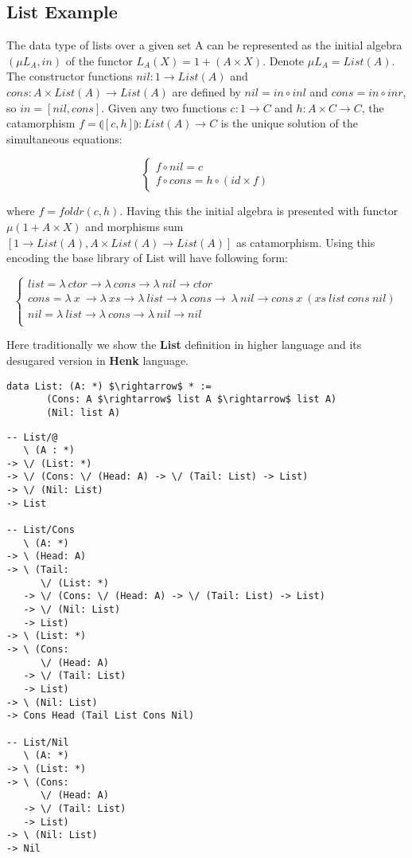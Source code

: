 \documentclass{article}
\begin{document}
\subsection{List Example}
The data type of lists over a given set A can be represented as the initial algebra
$(\mu L_A, in)$ of the functor $L_A(X) = 1 + (A \times X)$. Denote $\mu L_A = List(A)$.
The constructor functions $nil: 1 \rightarrow List(A)$ and
$cons: A \times List(A) \rightarrow List(A)$ are defined by
$nil = in \circ inl$ and $cons = in \circ inr$, so $in = [nil,cons]$.
Given any two functions $c: 1 \rightarrow C$ and $h: A \times C \rightarrow C$,
the catamorphism $f = \llparenthesis [c,h] \rrparenthesis : List(A) \rightarrow C$
is the unique solution of the simultaneous equations:

$$
\begin{cases}
  f \circ nil  = c \\
  f \circ cons = h \circ (id \times f)
\end{cases}
$$

where $f = foldr(c,h)$. Having this the initial algebra is presented with functor
$\mu (1 + A \times X)$ and morphisms sum $[1 \rightarrow List(A), A \times List(A) \rightarrow List(A)]$
as catamorphism. Using this encoding the base library of List will have following form:

$$
\begin{cases}
list = \lambda\ ctor \rightarrow \lambda\ cons \rightarrow \lambda\ nil \rightarrow ctor\\
cons = \lambda\ x\ \rightarrow \lambda\ xs \rightarrow \lambda\ list \rightarrow \lambda\ cons \rightarrow\ \lambda\ nil \rightarrow cons\ x\ (xs\ list\ cons\ nil)\\
nil = \lambda\ list \rightarrow \lambda\ cons \rightarrow \lambda\ nil \rightarrow nil\\
\end{cases}
$$

Here traditionally we show the {\bf List} definition in higher language and its
desugared version in {\bf Henk} language.

\begin{lstlisting}[mathescape=true]
  data List: (A: *) $\rightarrow$ * :=
       (Cons: A $\rightarrow$ list A $\rightarrow$ list A)
       (Nil: list A)
\end{lstlisting}

\begin{lstlisting}[mathescape=true]
-- List/@
   \ (A : *)
-> \/ (List: *)
-> \/ (Cons: \/ (Head: A) -> \/ (Tail: List) -> List)
-> \/ (Nil: List)
-> List

-- List/Cons
   \ (A: *)
-> \ (Head: A)
-> \ (Tail:
      \/ (List: *)
   -> \/ (Cons: \/ (Head: A) -> \/ (Tail: List) -> List)
   -> \/ (Nil: List)
   -> List)
-> \ (List: *)
-> \ (Cons:
      \/ (Head: A)
   -> \/ (Tail: List)
   -> List)
-> \ (Nil: List)
-> Cons Head (Tail List Cons Nil)

-- List/Nil
   \ (A: *)
-> \ (List: *)
-> \ (Cons:
      \/ (Head: A)
   -> \/ (Tail: List)
   -> List)
-> \ (Nil: List)
-> Nil
\end{lstlisting}
\end{document}
